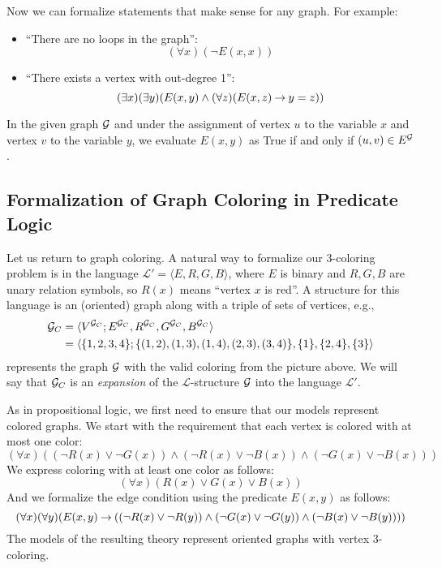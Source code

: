 Now we can formalize statements that make sense for any graph. For example: 
\begin{itemize}
    \item ``There are no loops in the graph'': \[ (\forall x)(\neg E(x, x)) \] 
    \item ``There exists a vertex with out-degree 1'': \[ (\exists x)(\exists y)(E(x, y) \land (\forall z)(E(x, z) \mathbin{\rightarrow} y = z)) \] 
\end{itemize}
In the given graph \(\mathcal{G}\) and under the assignment of vertex \( u \) to the variable \( x \) and vertex \( v \) to the variable \( y \), we evaluate \( E(x, y) \) as True if and only if \( (u, v) \in E^{\mathcal{G}} \).


\subsection{Formalization of Graph Coloring in Predicate Logic}

Let us return to graph coloring. A natural way to formalize our 3-coloring problem is in the language \( \mathcal{L'} = \langle E, R, G, B \rangle \), where \(E\) is binary and \(R, G, B\) are unary relation symbols, so \(R(x)\) means ``vertex \( x \) is red''. A structure for this language is an (oriented) graph along with a triple of sets of vertices, e.g.,
\begin{align*}
\mathcal{G}_C &= \langle V^{\mathcal{G}_C}; E^{\mathcal{G}_C}, R^{\mathcal{G}_C}, G^{\mathcal{G}_C}, B^{\mathcal{G}_C} \rangle \\
&= \langle \{1, 2, 3, 4\}; \{(1, 2), (1, 3), (1, 4), (2, 3), (3, 4)\}, \{1\}, \{2, 4\}, \{3\} \rangle    
\end{align*}
represents the graph \( \mathcal{G} \) with the valid coloring from the picture above. We will say that \( \mathcal{G}_C \) is an \emph{expansion} of the \(\mathcal{L}\)-structure \( \mathcal{G} \) into the language \( \mathcal{L'} \).

As in propositional logic, we first need to ensure that our models represent colored graphs. We start with the requirement that each vertex is colored with at most one color:
\[
(\forall x)((\neg R(x) \lor \neg G(x)) \land (\neg R(x) \lor \neg B(x)) \land (\neg G(x) \lor \neg B(x)))
\]
We express coloring with at least one color as follows:
\[
(\forall x)(R(x) \lor G(x) \lor B(x))
\]
And we formalize the edge condition using the predicate \( E(x, y) \) as follows:
\[	
(\forall x)(\forall y)(E(x, y) \mathbin{\rightarrow} ((\neg R(x) \lor \neg R(y)) \land (\neg G(x) \lor \neg G(y)) \land (\neg B(x) \lor \neg B(y))))
\]
The models of the resulting theory represent oriented graphs with vertex 3-coloring.


